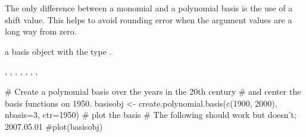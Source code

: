 \documentclass{article}
\begin{document}
\begin{Details}\relax
The only difference between a monomial and a polynomial basis
is the use of a shift value.  This helps to avoid rounding error
when the argument values are a long way from zero.
\end{Details}
\begin{Value}
a basis object with the type .
\end{Value}
\begin{SeeAlso}\relax
{}, 
, 
, 
, 
, 
, 
, 
\end{SeeAlso}
\begin{Examples}
\begin{ExampleCode}
#  Create a polynomial basis over the years in the 20th century
#  and center the basis functions on 1950.
basisobj <- create.polynomial.basis(c(1900, 2000), nbasis=3, ctr=1950)
#  plot the basis
# The following should work but doesn't;  2007.05.01
#plot(basisobj)
\end{ExampleCode}
\end{Examples}
\end{document}

